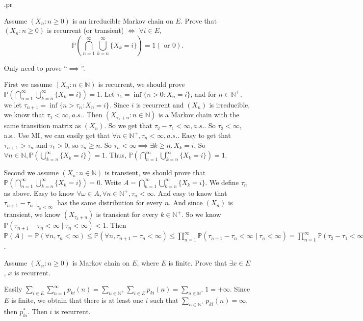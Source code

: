 \documentclass[../main]{subfiles}
\begin{document}
.pr
\begin{problem}\label{pro:1}
  Assume \((X_n:n \geq 0)\) is an irreducible Markov chain on \(E\).
  Prove that \((X_n:n \geq 0)\) is recurrent (or transient) \(\iff\)
  \(\forall i \in E\),
  \[
    \mathbb{P}\left(\bigcap_{n=1}^{\infty} \bigcup_{k=n}^{\infty} \{X_k=i\}\right)=1 (\text{ or } 0).
  \]
\end{problem}
\begin{solution}
  Only need to prove ``\(\implies\)''.

  First we assume \((X_n:n \in \mathbb{N})\) is recurrent, we should prove \(\mathbb{P}\left(\bigcap_{n=1}^{\infty} \bigcup_{k=n}^{\infty} \{X_k=i\}\right)=1\).
  Let \(\tau_1=\inf \{n > 0:X_n=i\}\), and for \(n \in \mathbb{N}^+\), we let \(\tau_{n+1}=\inf \{n > \tau_n:X_n=i\}\).
  Since \(i\) is recurrent and \((X_n)\) is irreducible, we know that \(\tau_1<\infty,a.s.\).
  Then \((X_{\tau_1+n}:n \in \mathbb{N})\) is a Markov chain with the same transition matrix as \((X_n)\).
  So we get that \(\tau_2-\tau_1 < \infty,a. s.\). So \(\tau_2<\infty\), a.s..
  Use MI, we can easily get that \(\forall n \in \mathbb{N}^+,\tau_n<\infty,a. s.\).
  Easy to get that \(\tau_{n+1}>\tau_n\) and \(\tau_1>0\), so \(\tau_n \geq n\).
  So \(\tau_n<\infty \implies \exists k \geq n,X_k=i\).
  So \(\forall n \in \mathbb{N},\mathbb{P}\left(  \bigcup_{k=n}^{\infty} \{X_k=i\}\right)=1\).
  Thus, \(\mathbb{P}\left(\bigcap_{n=1}^{\infty} \bigcup_{k=n}^{\infty} \{X_k=i\}\right)=1\).

  Second we assume \((X_n:n \in \mathbb{N})\) is transient, we should prove that \(\mathbb{P}\left(\bigcap_{n=1}^{\infty} \bigcup_{k=n}^{\infty} \{X_k=i\}\right)=0\).
  Write \(A=\bigcap_{n=1}^{\infty} \bigcup_{k=n}^{\infty} \{X_k=i\}\).
  We define \(\tau_n \) as above. Easy to know \(\forall \omega \in A,\forall n \in \mathbb{N}^+,\tau_n<\infty\).
  And easy to know that \(\tau_{n+1}-\tau_n \mid_{\tau_n<\infty}\) has the same distribution for every \(n\).
  And since \((X_n)\) is transient, we know \((X_{\tau_k+n})\) is transient for every \(k \in \mathbb{N}^+\).
  So we know \(\mathbb{P}(\tau_{n+1}-\tau_n<\infty \mid \tau_n<\infty)<1\).
  Then \(\mathbb{P}(A)=\mathbb{P}(\forall n,\tau_n < \infty) \leq \mathbb{P}(\forall n,\tau_{n+1}-\tau_n<\infty) \leq \prod_{n=1}^{\infty} \mathbb{P}(\tau_{n+1}-\tau_n<\infty \mid \tau_n<\infty)=\prod_{n=1}^{\infty} \mathbb{P}(\tau_2-\tau_1<\infty \mid \tau_1<\infty)=0\).
\end{solution}

\begin{problem}\label{pro:3}
  Assume \((X_n: n \geq 0)\) is Markov chain on \(E\), where \(E\) is finite. Prove that \(\exists x \in E\), \(x\) is recurrent.
\end{problem}
\begin{solution}
  Easily \(\sum_{i \in E}\sum_{n=1}^{\infty} p_{ki}(n)=\sum_{n \in \mathbb{N}^+}\sum_{i \in E}p_{ki}(n)=\sum_{n \in \mathbb{N}^+} 1=+\infty\).
  Since \(E\) is finite, we obtain that there is at least one \(i\) such that \(\sum_{n \in \mathbb{N}^+}p_{ki}(n)=\infty\), then \(p_{ki}^{*}\).
  Then \(i\) is recurrent.
\end{solution}
\end{document}
